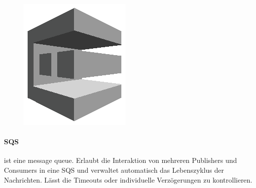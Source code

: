 \documentclass[
12pt,
english,
ngerman,
headsepline,
twoside,
openright,
numbers=noenddot,version=first
]{scrreprt}
\begin{document}
\begin{figure}
	\includegraphics[width=0.9\linewidth]{./pics/aws/Messaging_GRAYSCALE_AmazonSQS.eps}
\end{figure}
\paragraph{\acrfull{SQS}}\label{par:sqs} ist eine message queue. Erlaubt die Interaktion von mehreren Publishers und Consumers in eine SQS und verwaltet automatisch das Lebenszyklus der Nachrichten. Lässt die Timeouts oder individuelle Verzögerungen zu kontrollieren.
\end{document}
